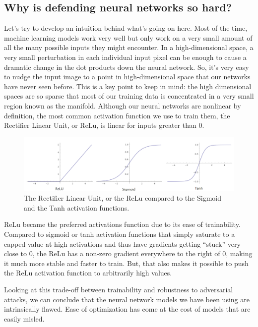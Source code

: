     \subsection{Why is defending neural networks so hard?}
        Let’s try to develop an intuition behind what’s going on here. Most of the time, machine learning models work very well but only work on a very small amount of all the many possible inputs they might encounter. In a high-dimensional space, a very small perturbation in each individual input pixel can be enough to cause a dramatic change in the dot products down the neural network. So, it’s very easy to nudge the input image to a point in high-dimensional space that our networks have never seen before. This is a key point to keep in mind: the high dimensional spaces are so sparse that most of our training data is concentrated in a very small region known as the manifold. Although our neural networks are nonlinear by definition, the most common activation function we use to train them, the Rectifier Linear Unit, or ReLu, is linear for inputs greater than $0$.

        \begin{figure}[htbp]
            \centering
            \includegraphics[width=\linewidth]{images/functions.png}
            \caption{The Rectifier Linear Unit, or the ReLu compared to the Sigmoid and the Tanh activation functions.}
        \end{figure}

        ReLu became the preferred activations function due to its ease of trainability. Compared to sigmoid or tanh activation functions that simply saturate to a capped value at high activations and thus have gradients getting “stuck” very close to $0$, the ReLu has a non-zero gradient everywhere to the right of $0$, making it much more stable and faster to train. But, that also makes it possible to push the ReLu activation function to arbitrarily high values.

        Looking at this trade-off between trainability and robustness to adversarial attacks, we can conclude that the neural network models we have been using are intrinsically flawed. Ease of optimization has come at the cost of models that are easily misled.		
